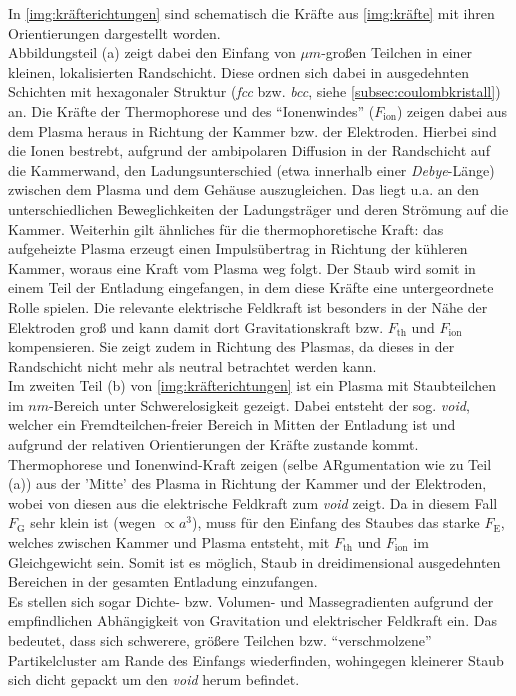 \documentclass[numbers=noenddot,a4paper]{scrartcl}
\newcommand{\ix}[1]{_\text{#1}}
\newcommand{\tilt}[1]{\textit{#1}}
\begin{document}
				In \ref{img:kräfterichtungen} sind schematisch die Kräfte aus \ref{img:kräfte} mit ihren Orientierungen dargestellt worden. \\
				Abbildungsteil (a) zeigt dabei den Einfang von $\unit{\mu m}$-großen Teilchen in einer kleinen, lokalisierten Randschicht. Diese ordnen sich dabei in ausgedehnten Schichten mit hexagonaler Struktur (\tilt{fcc} bzw. \tilt{bcc}, siehe \ref{subsec:coulombkristall}) an. Die Kräfte der Thermophorese und des "`Ionenwindes"' ($F\ix{ion}$) zeigen dabei aus dem Plasma heraus in Richtung der Kammer bzw. der Elektroden. Hierbei sind die Ionen bestrebt, aufgrund der ambipolaren Diffusion in der Randschicht auf die Kammerwand, den Ladungsunterschied (etwa innerhalb einer \tilt{Debye}-Länge) zwischen dem Plasma und dem Gehäuse auszugleichen. Das liegt u.a. an den unterschiedlichen Beweglichkeiten der Ladungsträger und deren Strömung auf die Kammer. Weiterhin gilt ähnliches für die thermophoretische Kraft: das aufgeheizte Plasma erzeugt einen Impulsübertrag in Richtung der kühleren Kammer, woraus eine Kraft vom Plasma weg folgt. Der Staub wird somit in einem Teil der Entladung eingefangen, in dem diese Kräfte eine untergeordnete Rolle spielen. Die relevante elektrische Feldkraft ist besonders in der Nähe der Elektroden groß und kann damit dort Gravitationskraft bzw. $F\ix{th}$ und $F\ix{ion}$ kompensieren. Sie zeigt zudem in Richtung des Plasmas, da dieses in der Randschicht nicht mehr als neutral betrachtet werden kann.\\
				Im zweiten Teil (b) von \ref{img:kräfterichtungen} ist ein Plasma mit Staubteilchen im $\unit{nm}$-Bereich unter Schwerelosigkeit gezeigt. Dabei entsteht der sog. \tilt{void}, welcher ein Fremdteilchen-freier Bereich in Mitten der Entladung ist und aufgrund der relativen Orientierungen der Kräfte zustande kommt. Thermophorese und Ionenwind-Kraft zeigen (selbe ARgumentation wie zu Teil (a)) aus der 'Mitte' des Plasma in Richtung der Kammer und der Elektroden, wobei von diesen aus die elektrische Feldkraft zum \tilt{void} zeigt. Da in diesem Fall $F\ix{G}$ sehr klein ist (wegen $\propto a^3$), muss für den Einfang des Staubes das starke $F\ix{E}$, welches zwischen Kammer und Plasma entsteht, mit $F\ix{th}$ und $F\ix{ion}$ im Gleichgewicht sein. Somit ist es m\"oglich, Staub in dreidimensional ausgedehnten Bereichen in der gesamten Entladung einzufangen.\\ Es stellen sich sogar Dichte- bzw. Volumen- und Massegradienten aufgrund der empfindlichen Abhängigkeit von Gravitation und elektrischer Feldkraft ein. Das bedeutet, dass sich schwerere, größere Teilchen bzw. "`verschmolzene"' Partikelcluster am Rande des Einfangs wiederfinden, wohingegen kleinerer Staub sich dicht gepackt um den \tilt{void} herum befindet.
				
\end{document}
